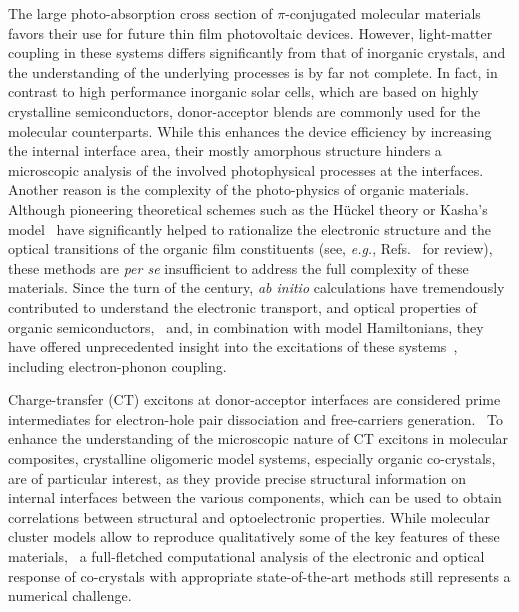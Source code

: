 \documentclass[journal=jpclcd,manuscript=letter]{achemso}
\begin{document}
The large photo-absorption cross section of $\pi$-conjugated molecular materials favors their use for future thin film photovoltaic devices.\cite{jail+12nm,inga18am} 
However, light-matter coupling in these systems differs significantly from that of inorganic crystals, and the understanding of the underlying processes is by far not complete.\cite{razy+11se} 
In fact, in contrast to high performance inorganic solar cells, which are based on highly crystalline semiconductors, donor-acceptor blends are commonly used for the molecular counterparts. While this enhances the device efficiency by increasing the internal interface area,\cite{facc11cm,brab+11csr} their mostly amorphous structure hinders a microscopic analysis of the involved photophysical processes at the interfaces. Another reason is the complexity of the photo-physics of organic materials. Although pioneering theoretical schemes such as the H\"uckel theory or Kasha's model~\cite{kash+65} have significantly helped to rationalize the electronic structure and the optical transitions of the organic film constituents (see, \textit{e.g.}, Refs.~ for review), these methods are \textit{per se} insufficient to address the full complexity of these materials. Since the turn of the century, \textit{ab initio} calculations have tremendously contributed to understand the electronic transport, and optical properties of organic semiconductors,~\cite{buss+02apl,cuda+12prb,rang+16prb,cocc+18pccp} and, in combination with model Hamiltonians, they have offered unprecedented insight into the excitations of these systems~\cite{delc+17prb,macd+20mh}, including electron-phonon coupling.~\cite{coro+02prb,hann+04prb}

Charge-transfer (CT) excitons at donor-acceptor interfaces are considered prime intermediates for electron-hole pair dissociation and free-carriers generation.~\cite{macd+20mh} To enhance the understanding of the microscopic nature of CT excitons in molecular composites, crystalline oligomeric model systems, especially organic co-crystals, are of particular interest, as they provide precise structural information on internal interfaces between the various components, which can be used to obtain correlations between structural and optoelectronic properties. While molecular cluster models allow to reproduce qualitatively some of the key features of these materials,~\cite{zimm+11jacs,arvi+20jpcb,mans+20jmcc,theu+21jpcc} a full-fletched computational analysis of the electronic and optical response of co-crystals with appropriate state-of-the-art methods still represents a numerical challenge. 
\end{document}
